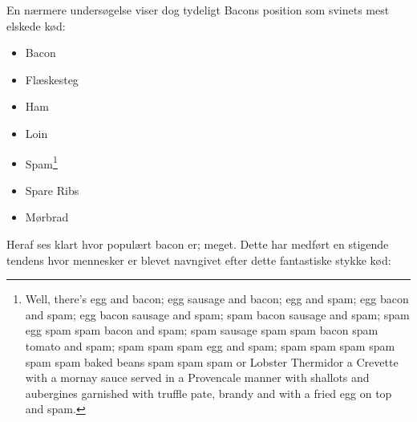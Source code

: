 En nærmere undersøgelse viser dog tydeligt Bacons position som svinets mest elskede kød:
\begin{itemize}
\item Bacon \cite{bib:url:WikiBacon}
\item Flæskesteg \cite{bib:url:WikiRoastPork}
\item Ham \cite{bib:url:WikiHam}
\item Loin \cite{bib:url:WikiLoin}
\item Spam\footnote{Well, there's egg and bacon; egg sausage and bacon; egg and spam; egg bacon and spam; egg bacon sausage and spam; spam bacon sausage and spam; spam egg spam spam bacon and spam; spam sausage spam spam bacon spam tomato and spam; spam spam spam egg and spam; spam spam spam spam spam spam baked beans spam spam spam or Lobster Thermidor a Crevette with a mornay sauce served in a Provencale manner with shallots and aubergines garnished with truffle pate, brandy and with a fried egg on top and spam.} \cite{bib:url:WikiSpam}
\item Spare Ribs \cite{bib:url:WikiSpareRibs}
\item Mørbrad \cite{bib:url:WikiTenderLoin}
\end{itemize}
\begin{center}
\end{center}

Heraf ses klart hvor populært bacon er; meget. Dette har medført en stigende tendens hvor mennesker er blevet navngivet efter dette fantastiske stykke kød:

